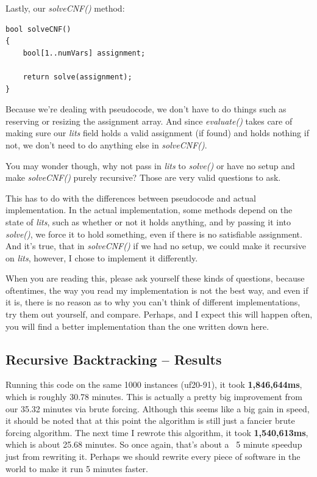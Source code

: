 \documentclass[../main.tex]{subfiles}
\begin{document}
Lastly, our \textit{solveCNF()} method:

\begin{lstlisting}
bool solveCNF()
{
    bool[1..numVars] assignment;

    return solve(assignment);
}
\end{lstlisting}

Because we're dealing with pseudocode, we don't have to do things such as
reserving or resizing the assignment array. And since \textit{evaluate()} takes
care of making sure our \textit{lits} field holds a valid assignment (if found)
and holds nothing if not, we don't need to do anything else in
\textit{solveCNF()}.

You may wonder though, why not pass in \textit{lits} to \textit{solve()} or
have no setup and make \textit{solveCNF()} purely recursive?
Those are very valid questions to ask.

This has to do with the differences between pseudocode and actual
implementation. In the actual implementation, some methods depend on the
state of \textit{lits}, such as whether or not it holds anything, and by passing
it into \textit{solve()}, we force it to hold something, even if there is no
satisfiable assignment. And it's true, that in \textit{solveCNF()} if we had no
setup, we could make it recursive on \textit{lits}, however, I chose to
implement it differently.

When you are reading this, please ask yourself these kinds of questions,
because oftentimes, the way you read my implementation is not the best way,
and even if it is, there is no reason as to why you can't think of different
implementations, try them out yourself, and compare. Perhaps, and I expect
this will happen often, you will find a better implementation than the one
written down here.

\subsection{Recursive Backtracking -- Results}

Running this code on the same 1000 instances (uf20-91), it took
\textbf{1,846,644ms}, which is roughly 30.78 minutes. This is actually a pretty big
improvement from our 35.32 minutes via brute forcing. Although this seems
like a big gain in speed, it should be noted that at this point the algorithm is
still just a fancier brute forcing algorithm. The next time I rewrote this algorithm,
it took \textbf{1,540,613ms}, which is about 25.68 minutes. So once again, that's about a 
~5 minute speedup just from rewriting it. Perhaps we should rewrite every piece of 
software in the world to make it run 5 minutes faster. 
\end{document}
